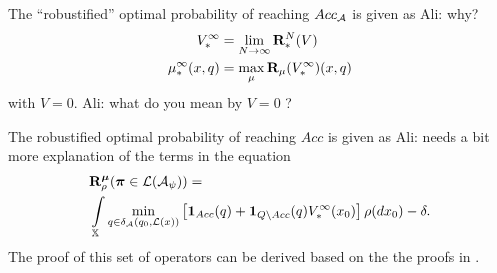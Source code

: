 \documentclass{ifacconf}
\renewcommand{\axx}[1]{{\color{orange} Ali: #1}}
\begin{document}
The ``robustified'' optimal probability of reaching $Acc_{\mathcal{A}}$ is given as
\axx{why?}
\begin{align}
	V^\infty_\ast & =\lim_{N\rightarrow \infty}{\mathbf {R}}_\ast^N (V) \\
	{\mu}^\infty_\ast(x,q)  &= \max_{\mu} {\mathbf {R}}_{\mu} (V_\ast^\infty)(x,q) 
\end{align}
with $V=0$.
\axx{what do you mean by $V=0$ ?}

The robustified optimal probability of reaching $Acc$ is given as
\axx{needs a bit more explanation of the terms in the equation}
\begin{align}
&\BelR_\init^\polb
(\word \in\mathcal L(\mathcal A_\psi))=\\ & \int_{\X}\min_{\bar q \in \delta_\FSA(q_0,\Labset(\bar x))}\left[\mathbf 1_{Acc}(\bar q)+ \mathbf 1_{Q \setminus Acc}(\bar q) V^\infty_\ast(x_0) \right]%
\init (d x_0)-\delta.
\end{align} 
The proof of this set of operators can be derived based on the the proofs in \citep{tech_report_TACAS}.
 




%
%
%
%
%
%  
%
%
%
\end{document}
